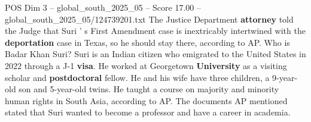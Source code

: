 \begin{textsample}{POS Dim 3 – global\_south\_2025\_05 – Score 17.00 – global\_south\_2025\_05/124739201.txt}
The Justice Department \textbf{attorney} told the Judge that Suri ' s First Amendment case is inextricably intertwined with the \textbf{deportation} case in Texas, so he should stay there, according to AP.
Who is Badar Khan Suri?
Suri is an Indian citizen who emigrated to the United States in 2022 through a J-1 \textbf{visa}.
He worked at Georgetown \textbf{University} as a visiting scholar and \textbf{postdoctoral} fellow.
He and his wife have three children, a 9-year-old son and 5-year-old twins.
He taught a course on majority and minority human rights in South Asia, according to AP.
The documents AP mentioned stated that Suri wanted to become a professor and have a career in academia.

\end{textsample}
